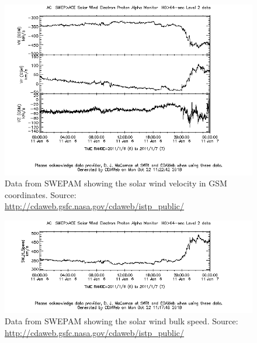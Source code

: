 \documentclass[norsk,a4paper,11pt]{article}
\begin{document}
\begin{multicols}{2}
\begin{figure}[H]
	\includegraphics[scale=0.4]{Figures/ACE_SE_velocityGSM.png}
	\centering
	\caption{Data from SWEPAM showing the solar wind velocity in GSM coordinates. Source: \url{http://cdaweb.gsfc.nasa.gov/cdaweb/istp_public/}}
	\label{fig:SWvelGSM}
\end{figure}

\begin{figure}[H]
	\includegraphics[scale=0.4]{Figures/ACE_SW_H_Speed.png}
	\centering
	\caption{Data from SWEPAM showing the solar wind bulk speed. Source: \url{http://cdaweb.gsfc.nasa.gov/cdaweb/istp_public/}}
	\label{fig:ACE_bulk}
\end{figure}


\end{multicols}
\end{document}

